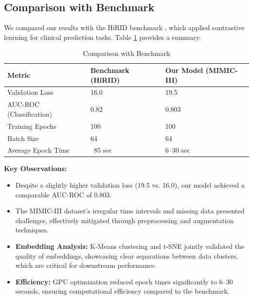 \documentclass[twocolumn]{article}
\begin{document}
    \subsection{Comparison with Benchmark}

    We compared our results with the HiRID benchmark \cite{yeche2021}, which
    applied contrastive learning for clinical prediction tasks. Table \ref{tab:benchmark_comparison1}
    provides a summary.

    \begin{table}[ht]
        \centering
        \small
        \setlength{\tabcolsep}{4pt}
        \renewcommand{\arraystretch}{1.1}
        \begin{tabular}{|p{3.2cm}|p{1.9cm}|p{1.9cm}|}
            \hline
            \textbf{Metric}          & \textbf{Benchmark} \newline (HiRID) & \textbf{Our Model} \newline (MIMIC-III) \\
            \hline
            Validation Loss          & 16.0                                & 19.5                                    \\
            AUC-ROC (Classification) & 0.82                                & 0.803                                   \\
            Training Epochs          & 100                                 & 100                                     \\
            Batch Size               & 64                                  & 64                                      \\
            Average Epoch Time       & ~85 sec                             & 6–30 sec                                \\
            \hline
        \end{tabular}
        \caption{Comparison with Benchmark}
        \label{tab:benchmark_comparison1}
    \end{table}

    \textbf{Key Observations:}
    \begin{itemize}
        \item Despite a slightly higher validation loss (19.5 vs. 16.0), our model
            achieved a comparable AUC-ROC of 0.803.

        \item The MIMIC-III dataset’s irregular time intervals and missing data presented
            challenges, effectively mitigated through preprocessing and
            augmentation techniques.

        \item \textbf{Embedding Analysis:} K-Means clustering and t-SNE jointly
            validated the quality of embeddings, showcasing clear separations between
            data clusters, which are critical for downstream performance.

        \item \textbf{Efficiency:} GPU optimization reduced epoch times
            significantly to 6–30 seconds, ensuring computational efficiency compared
            to the benchmark.
    \end{itemize}
\end{document}
